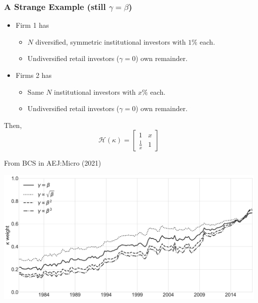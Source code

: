 \documentclass[handout, serif, aspectratio=169, 10pt]{beamer}
\begin{document}
\begin{frame}[plain,label=strangeexample]
\frametitle{A Strange Example (still $\gamma = \beta$)}
\begin{itemize}
\item Firm 1 has
\begin{itemize}
\item $N$ diversified, symmetric institutional investors with $1\%$ each.
\item Undiversified retail investors ($\gamma = 0$) own remainder.
\end{itemize}
\item Firms 2 has 
\begin{itemize}
\item Same $N$ institutional investors with $x$\% each.
\item Undiversified retail investors ($\gamma = 0$) own remainder.
\end{itemize}
\end{itemize}
Then,
$$
\mathcal{H}\left(\kappa\right) = \begin{bmatrix}1 & x \\ \frac{1}{x} & 1\end{bmatrix}  
$$
\end{frame}


\begin{frame}[plain,label=kappaalt]{From BCS in AEJ:Micro (2021)}
\begin{center}
\includegraphics[height = 0.9\textheight ]{figures/figure13_kappa_control}
\end{center}
\end{frame}
\end{document}
